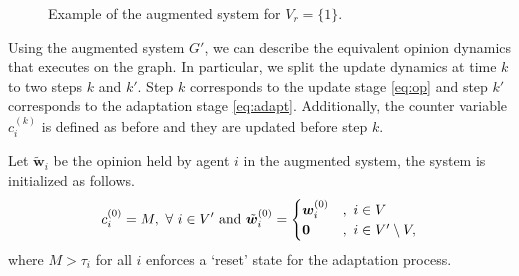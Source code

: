 \documentclass[letter]{article}
\theoremstyle{remark}
\begin{document}
\begin{figure}[t]
\centerline{
}
\caption{Example of the augmented system for $V_r = \{1\}$. 
} \label{fig:augment}
\end{figure}

Using the augmented system $G'$, we can describe the equivalent opinion dynamics that executes on the graph. In particular, we split the update dynamics at time $k$ to two steps $k$ and $k'$. Step $k$ corresponds to the update stage \eqref{eq:op} and step $k'$ corresponds to the adaptation stage \eqref{eq:adapt}. 
Additionally, the counter variable $c_i^{(k)}$ is defined as before and they are updated before step $k$. 

Let $\tilde{ \bm w}_i$ be the opinion held by agent $i$ in the augmented system, the system is initialized as follows.
\[
c_i^{(0)} = M,~\forall~ i \in V'~{\rm and}~\tilde{ \bm w}_i^{(0)} = \begin{cases} { \bm w}_i^{(0)} &,~i \in V \\
 {\bf 0} &,~i \in V' \setminus V, \end{cases}
\]
where $M > \tau_i$ for all $i$ enforces a `reset' state for the adaptation process. 
\end{document}
